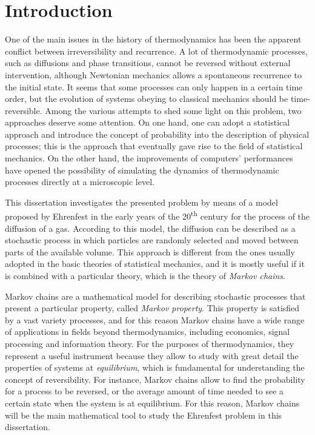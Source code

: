 \chapter{Introduction}
One of the main issues in the history of thermodynamics has been the apparent conflict between irreversibility and recurrence. A lot of thermodynamic processes, such as diffusions and phase transitions, cannot be reversed without external intervention, although Newtonian mechanics allows a spontaneous recurrence to the initial state. It seems that some processes can only happen in a certain time order, but the evolution of systems obeying to classical mechanics should be time-reversible. Among the various attempts to shed some light on this problem, two approaches deserve some attention. On one hand, one can adopt a statistical approach and introduce the concept of probability into the description of physical processes; this is the approach that eventually gave rise to the field of statistical mechanics. On the other hand, the improvements of computers' performances have opened the possibility of simulating the dynamics of thermodynamic processes directly at a microscopic level.

This dissertation investigates the presented problem by means of a model proposed by Ehrenfest in the early years of the 20\textsuperscript{th} century for the process of the diffusion of a gas. According to this model, the diffusion can be described as a stochastic process in which particles are randomly selected and moved between parts of the available volume. This approach is different from the ones usually adopted in the basic theories of statistical mechanics, and it is mostly useful if it is combined with a particular theory, which is the theory of \emph{Markov chains}.

Markov chains are a mathematical model for describing stochastic processes that present a particular property, called \emph{Markov property}. This property is satisfied by a vast variety processes, and for this reason Markov chains have a wide range of applications in fields beyond thermodynamics, including economics, signal processing and information theory. For the purposes of thermodynamics, they represent a useful instrument because they allow to study with great detail the properties of systems at \emph{equilibrium}, which is fundamental for understanding the concept of reversibility. For instance, Markov chains allow to find the probability for a process to be reversed, or the average amount of time needed to see a certain state when the system is at equilibrium. For this reason, Markov chains will be the main mathematical tool to study the Ehrenfest problem in this dissertation.

